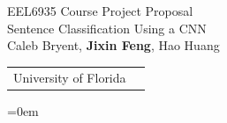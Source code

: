 \documentclass{beamer}
\begin{document}
{
\begin{frame}[plain,c]
\begin{center}
  {\color[RGB]{241,243,186}
{\huge EEL6935 Course Project Proposal\\
    \vspace*{0.5em}
    Sentence Classification Using a CNN}\\
  \vspace*{1.8in}
    Caleb Bryent, {\bf Jixin Feng}, Hao Huang \\
    \vspace*{1em}
  \begin{tabular}{cc}
  University of Florida
   \end{tabular}
}
  \end{center}
\hoffset=0em
\end{frame}}
\end{document}
